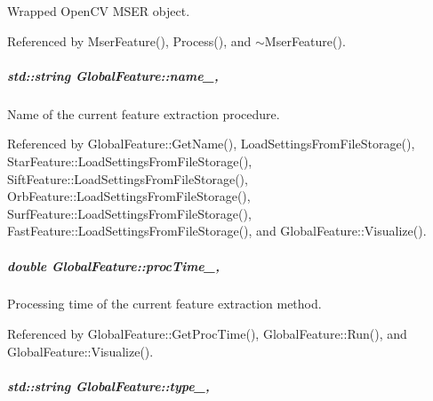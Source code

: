 Wrapped Open\-C\-V M\-S\-E\-R object. 



Referenced by Mser\-Feature(), Process(), and $\sim$\-Mser\-Feature().

\hypertarget{group___feature_extractor_abee52be830de272bd27685083bf28aae}{
\subparagraph[{name\-\_\-}]{\setlength{\rightskip}{0pt plus 5cm}std\-::string Global\-Feature\-::name\-\_\-\hspace{0.3cm}{\ttfamily [protected]}, {\ttfamily [inherited]}}}\label{group___feature_extractor_abee52be830de272bd27685083bf28aae}


Name of the current feature extraction procedure. 



Referenced by Global\-Feature\-::\-Get\-Name(), Load\-Settings\-From\-File\-Storage(), Star\-Feature\-::\-Load\-Settings\-From\-File\-Storage(), Sift\-Feature\-::\-Load\-Settings\-From\-File\-Storage(), Orb\-Feature\-::\-Load\-Settings\-From\-File\-Storage(), Surf\-Feature\-::\-Load\-Settings\-From\-File\-Storage(), Fast\-Feature\-::\-Load\-Settings\-From\-File\-Storage(), and Global\-Feature\-::\-Visualize().

\hypertarget{group___feature_extractor_aa3306975b929f5503dac51829f9e04a0}{
\subparagraph[{proc\-Time\-\_\-}]{\setlength{\rightskip}{0pt plus 5cm}double Global\-Feature\-::proc\-Time\-\_\-\hspace{0.3cm}{\ttfamily [protected]}, {\ttfamily [inherited]}}}\label{group___feature_extractor_aa3306975b929f5503dac51829f9e04a0}


Processing time of the current feature extraction method. 



Referenced by Global\-Feature\-::\-Get\-Proc\-Time(), Global\-Feature\-::\-Run(), and Global\-Feature\-::\-Visualize().

\hypertarget{group___feature_extractor_ad467857c4bc3d0fe65ba29e3b8f7c796}{
\subparagraph[{type\-\_\-}]{\setlength{\rightskip}{0pt plus 5cm}std\-::string Global\-Feature\-::type\-\_\-\hspace{0.3cm}{\ttfamily [protected]}, {\ttfamily [inherited]}}}\label{group___feature_extractor_ad467857c4bc3d0fe65ba29e3b8f7c796}


